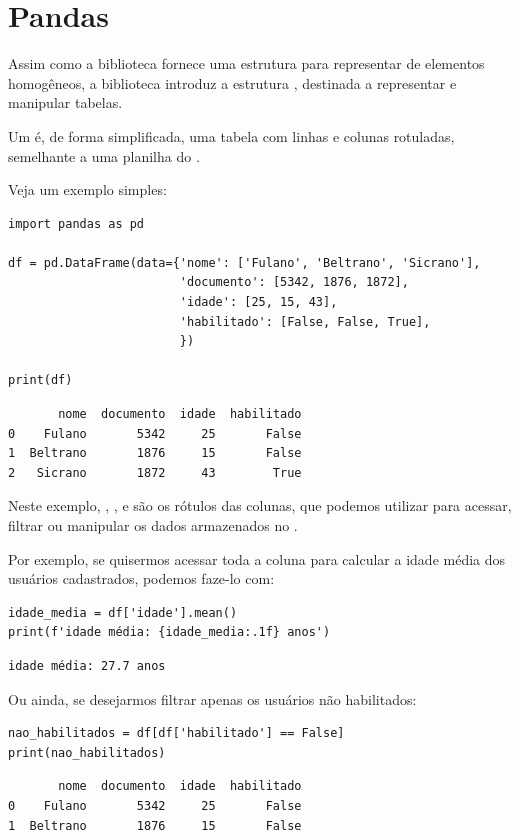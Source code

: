 \section{Pandas}

Assim como a biblioteca  fornece uma estrutura para representar  de elementos homogêneos,
a biblioteca  introduz a estrutura , destinada a representar e manipular tabelas.

Um  é, de forma simplificada, uma tabela com linhas e colunas rotuladas, semelhante a uma
planilha do .

Veja um exemplo simples:
\begin{verbatim}
import pandas as pd

df = pd.DataFrame(data={'nome': ['Fulano', 'Beltrano', 'Sicrano'],
                        'documento': [5342, 1876, 1872],
                        'idade': [25, 15, 43],
                        'habilitado': [False, False, True],
                        })

print(df)
\end{verbatim}
\begin{verbatim}
       nome  documento  idade  habilitado
0    Fulano       5342     25       False
1  Beltrano       1876     15       False
2   Sicrano       1872     43        True
\end{verbatim}

Neste exemplo, , ,  e  são os rótulos das colunas,
que podemos utilizar para acessar, filtrar ou manipular os dados armazenados no .

Por exemplo, se quisermos acessar toda a coluna  para calcular a idade média dos usuários cadastrados,
podemos faze-lo com:
\begin{verbatim}
idade_media = df['idade'].mean()
print(f'idade média: {idade_media:.1f} anos')
\end{verbatim}
\begin{verbatim}
idade média: 27.7 anos
\end{verbatim}

Ou ainda, se desejarmos filtrar apenas os usuários não habilitados:
\begin{verbatim}
nao_habilitados = df[df['habilitado'] == False]
print(nao_habilitados)
\end{verbatim}
\begin{verbatim}
       nome  documento  idade  habilitado
0    Fulano       5342     25       False
1  Beltrano       1876     15       False
\end{verbatim}

